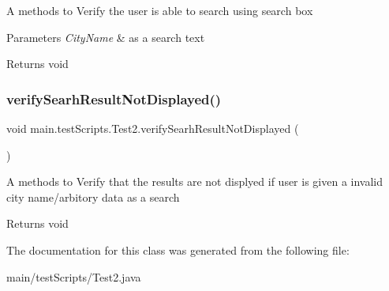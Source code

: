 A  methods to Verify the user is able to search using search box 
\begin{DoxyParams}{Parameters}
{\em City\+Name} & as a search text \\
\hline
\end{DoxyParams}
\begin{DoxyReturn}{Returns}
void 
\end{DoxyReturn}
\mbox{\label{classmain_1_1test_scripts_1_1_test2_a8cbf8c3569b59359240b66cc0bf45e08}} 
\subsubsection{\texorpdfstring{verify\+Searh\+Result\+Not\+Displayed()}{verifySearhResultNotDisplayed()}}
{\footnotesize\ttfamily void main.\+test\+Scripts.\+Test2.\+verify\+Searh\+Result\+Not\+Displayed (\begin{DoxyParamCaption}{ }\end{DoxyParamCaption})}

A  methods to Verify that the results are not displyed if user is given a invalid city name/arbitory data as a search \begin{DoxyReturn}{Returns}
void 
\end{DoxyReturn}


The documentation for this class was generated from the following file\+:\begin{DoxyCompactItemize}
\item 
main/test\+Scripts/Test2.\+java\end{DoxyCompactItemize}

